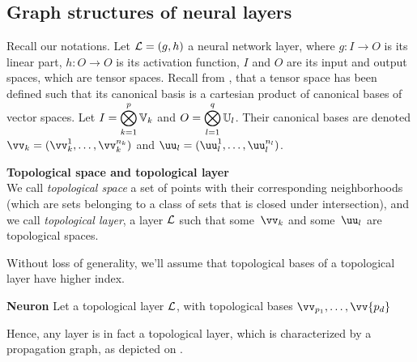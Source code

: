 \subsection{Graph structures of neural layers}

Recall our notations. Let $\mathcal{L} = (g,h)$ a neural network layer, where $g: I \rightarrow O$ is its linear part, $h : O \rightarrow O$ is its activation function, $I$ and $O$ are its input and output spaces, which are tensor spaces. Recall from , that a tensor space has been defined such that its canonical basis is a cartesian product of canonical bases of vector spaces. Let $I = \displaystyle \bigotimes_{k=1}^p \mathbb{V}_k$ and $O = \displaystyle \bigotimes_{l=1}^q \mathbb{U}_l$.
Their canonical bases are denoted $\vv_k = (\vv_k^1, \ldots, \vv_k^{n_k})$ and $\uu_l = (\uu_l^1, \ldots, \uu_l^{n_l})$.

\begin{definition}\textbf{Topological space and topological layer}\\
We call \emph{topological space} a set of points with their corresponding neighborhoods (which are sets belonging to a class of sets that is closed under intersection), and we call \emph{topological layer}, a layer $\mathcal{L}$ such that some~$\vv_k$ and some~$\uu_l$ are topological spaces.
\end{definition}

Without loss of generality, we'll assume that topological bases of a topological layer have higher index.

\begin{definition}\textbf{Neuron}
Let a topological layer $\mathcal{L}$, with topological bases $\vv_{p_1}, \ldots, \vv{p_d}$

\end{definition}





 Hence, any layer is in fact a topological layer, which is characterized by a propagation graph, as depicted on .

